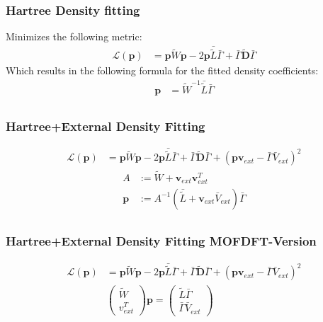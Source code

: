 \subsubsection{Hartree Density fitting}
Minimizes the following metric:
\begin{align}
        \mathcal{L}(\mathbf{p}) &= \mathbf{p} \tilde{W} \mathbf{p} - 2 \mathbf{p}\bar {\tilde L} \bar\Gamma + \bar\Gamma \tilde{\mathbf{D}}\bar\Gamma
\end{align}
Which results in the following formula for the fitted density coefficients:
\begin{align}
    \mathbf{p}&=\tilde{W}^{-1}\bar {\tilde L} \bar\Gamma\\
\end{align}


\subsubsection{Hartree+External Density Fitting}
\begin{align}
        \mathcal{L}(\mathbf{p}) &= \mathbf{p} \tilde{W} \mathbf{p} - 2 \mathbf{p}\bar {\tilde L} \bar\Gamma + \bar\Gamma \tilde{\mathbf{D}}\bar\Gamma + (\mathbf{p}\mathbf{v}_{ext}-\bar\Gamma \bar{V}_{ext})^2
\end{align}
\begin{align}
    A&:=\tilde{W}+\mathbf{v}_{ext}\mathbf{v}_{ext}^T\\
    \mathbf{p}&:=A^{-1}\left(\bar {\tilde L}+\mathbf{v}_{ext}\bar{V}_{ext}\right) \bar\Gamma\\
\end{align}

\subsubsection{Hartree+External Density Fitting MOFDFT-Version}
\begin{align}
\mathcal{L}(\mathbf{p}) &= \mathbf{p} \tilde{W} \mathbf{p} - 2 \mathbf{p}\bar {\tilde L} \bar\Gamma + \bar\Gamma \tilde{\mathbf{D}}\bar\Gamma + (\mathbf{p}\mathbf{v}_{ext}-\bar\Gamma \bar{V}_{ext})^2\\
&\left(\begin{array}{c}\tilde{W}\\v_{ext}^T\end{array}\right) \mathbf{p} =  \left(\begin{array}{c}\tilde{L} \bar{\Gamma} \\ \bar{\Gamma}\bar{V}_{ext}\end{array}\right)
\end{align}


